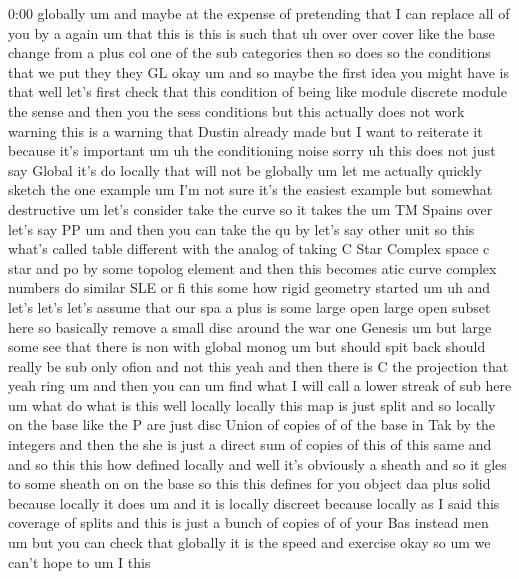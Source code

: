 \begin{unfinished}{0:00}
globally
um  and  maybe  at  the  expense  of
pretending  that  I  can  replace  all  of  you
by  a  again
um  that  this  is  this  is  such  that  uh
over  over
cover  like  the  base  change
from  a  plus
col  one  of  the  sub
categories
then  so
does  so  the  conditions  that  we  put  they
they
GL
okay
um  and  so  maybe  the  first  idea  you  might
have  is  that  well  let's  first  check  that
this  condition  of  being  like  module
discrete  module  the  sense  and  then  you
the  sess  conditions  but  this  actually
does  not
work  warning  this  is  a  warning  that
Dustin  already  made  but  I  want  to
reiterate  it  because  it's  important
um  uh  the
conditioning  noise  sorry  uh  this  does
not
just  say
Global  it's  do  locally  that  will  not
be  globally  um  let  me  actually  quickly
sketch  the  one  example  um  I'm  not  sure
it's  the  easiest  example  but  somewhat
destructive
um  let's  consider  take  the  curve  so  it
takes
the  um  TM  Spains
over  let's  say
PP
um  and  then  you  can  take  the  qu  by  let's
say  other  unit  so  this  what's  called
table
different  with  the  analog  of  taking  C
Star  Complex  space  c  star  and  po  by  some
topolog  element  and  then
this  becomes
atic  curve  complex  numbers  do  similar
SLE  or  fi  this  some  how  rigid  geometry
started
um  uh  and  let's  let's  let's  assume  that
our  spa  a  plus  is  some  large  open  large
open  subset
here  so  basically  remove  a  small  disc
around  the  war  one  Genesis  um  but  large
some  see  that  there  is  non  with  global
monog  um  but  should  spit  back  should
really  be  sub  only  ofion  and  not  this
yeah  and  then  there  is  C  the  projection
that
yeah
ring  um
and  then  you
can
um  find  what  I  will  call  a  lower  streak
of  sub
here
um  what  do  what  is  this  well
locally  locally  this  map  is  just  split
and  so  locally  on  the  base  like  the  P
are  just  disc  Union  of  copies  of  of  the
base  in  Tak  by  the  integers  and  then  the
she  is  just  a  direct  sum  of  copies  of
this  of  this
same  and  and  so  this  this  how  defined
locally
and  well  it's  obviously  a  sheath  and  so
it  gles  to  some  sheath  on  on  the  base  so
this  this  defines  for  you  object  daa
plus
solid  because  locally  it
does
um  and  it  is  locally  discreet  because
locally  as  I  said  this  coverage  of
splits  and  this  is  just  a  bunch  of
copies  of  of  your  Bas  instead  men  um  but
you  can  check  that  globally  it  is  the
speed  and
exercise
okay  so  um  we  can't  hope  to  um  I  this

\end{unfinished}
